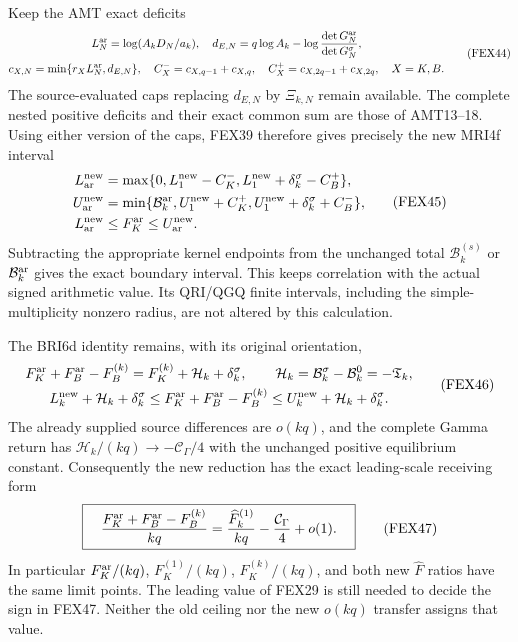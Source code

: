 \documentclass[11pt,a4paper]{article}
\begin{document}
Keep the AMT exact deficits
\[
\begin{gathered}
 L_N^{\rm ar}=\log(A_kD_N/a_k),\quad
 d_{E,N}=q\log A_k-\log\frac{\det G_N^{\rm ar}}{\det G_N^\sigma},\\
 c_{X,N}=\min\{r_XL_N^{\rm ar},d_{E,N}\},\quad
 C_X^-=c_{X,q-1}+c_{X,q},\quad C_X^+=c_{X,2q-1}+c_{X,2q},\quad X=K,B.
\end{gathered}\tag{FEX44}
\]
The source-evaluated caps replacing $d_{E,N}$ by $\Xi_{k,N}$ remain
available. The complete nested positive deficits and their exact common
sum are those of AMT13--18. Using either version of the caps, FEX39
therefore gives precisely the new MRI4f interval
\[
\begin{split}
 L_{\rm ar}^{\rm new}&=\max\{0,L_1^{\rm new}-C_K^-,
                         L_1^{\rm new}+\delta_k^\sigma-C_B^+\},\\
 U_{\rm ar}^{\rm new}&=\min\{\mathcal B_k^{\rm ar},U_1^{\rm new}+C_K^+,
                         U_1^{\rm new}+\delta_k^\sigma+C_B^-\},\\
 L_{\rm ar}^{\rm new}&\le F_K^{\rm ar}\le U_{\rm ar}^{\rm new}.
\end{split}\tag{FEX45}
\]
Subtracting the appropriate kernel endpoints from the unchanged total
$\mathcal B_k^{(s)}$ or $\mathcal B_k^{\rm ar}$ gives the exact boundary
interval. This keeps correlation with the actual signed arithmetic
value. Its QRI/QGQ finite intervals, including the simple-multiplicity
nonzero radius, are not altered by this calculation.

The BRI6d identity remains, with its original orientation,
\[
\begin{gathered}
 F_K^{\rm ar}+F_B^{\rm ar}-F_B^{(k)}
       =F_K^{(k)}+\mathcal H_k+\delta_k^\sigma,\qquad
 \mathcal H_k=\mathcal B_k^\sigma-\mathcal B_k^0=-\mathfrak T_k,\\
 L_k^{\rm new}+\mathcal H_k+\delta_k^\sigma
 \le F_K^{\rm ar}+F_B^{\rm ar}-F_B^{(k)}
 \le U_k^{\rm new}+\mathcal H_k+\delta_k^\sigma.
\end{gathered}\tag{FEX46}
\]
The already supplied source differences are $o(kq)$, and the complete
Gamma return has $\mathcal H_k/(kq)\to-\mathcal C_\Gamma/4$ with the
unchanged positive equilibrium constant. Consequently the new reduction
has the exact leading-scale receiving form
\[
 \boxed{\quad
 \frac{F_K^{\rm ar}+F_B^{\rm ar}-F_B^{(k)}}{kq}
  =\frac{\widehat F_k^{(1)}}{kq}-\frac{\mathcal C_\Gamma}{4}+o(1).
 \quad}\tag{FEX47}
\]
In particular $F_K^{\rm ar}/(kq)$, $F_K^{(1)}/(kq)$,
$F_K^{(k)}/(kq)$, and both new $\widehat F$ ratios have the same limit
points. The leading value of FEX29 is still needed to decide the sign
in FEX47. Neither the old ceiling nor the new $o(kq)$ transfer assigns
that value.
\end{document}
